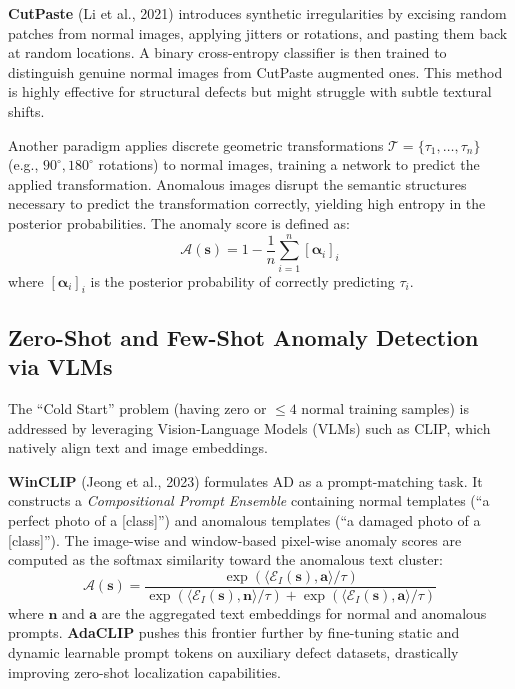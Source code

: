 \textbf{CutPaste} (Li et al., 2021) introduces synthetic irregularities by excising random patches from normal images, applying jitters or rotations, and pasting them back at random locations. A binary cross-entropy classifier is then trained to distinguish genuine normal images from CutPaste augmented ones. This method is highly effective for structural defects but might struggle with subtle textural shifts.

Another paradigm applies discrete geometric transformations $\mathcal{T} = \{\tau_1, \dots, \tau_n\}$ (e.g., $90^\circ, 180^\circ$ rotations) to normal images, training a network to predict the applied transformation. Anomalous images disrupt the semantic structures necessary to predict the transformation correctly, yielding high entropy in the posterior probabilities. The anomaly score is defined as:
\begin{equation}
    \mathcal{A}(\boldsymbol{s}) = 1 - \frac{1}{n} \sum_{i=1}^n [\boldsymbol{\alpha}_i]_i
\end{equation}
where $[\boldsymbol{\alpha}_i]_i$ is the posterior probability of correctly predicting $\tau_i$.

\subsection{Zero-Shot and Few-Shot Anomaly Detection via VLMs}
The ``Cold Start'' problem (having zero or $\le 4$ normal training samples) is addressed by leveraging Vision-Language Models (VLMs) such as CLIP, which natively align text and image embeddings.

\textbf{WinCLIP} (Jeong et al., 2023) formulates AD as a prompt-matching task. It constructs a \textit{Compositional Prompt Ensemble} containing normal templates (``a perfect photo of a [class]'') and anomalous templates (``a damaged photo of a [class]''). The image-wise and window-based pixel-wise anomaly scores are computed as the softmax similarity toward the anomalous text cluster:
\begin{equation}
    \mathcal{A}(\boldsymbol{s}) = \frac{\exp(\langle \mathcal{E}_I(\boldsymbol{s}), \boldsymbol{a} \rangle / \tau)}{\exp(\langle \mathcal{E}_I(\boldsymbol{s}), \boldsymbol{n} \rangle / \tau) + \exp(\langle \mathcal{E}_I(\boldsymbol{s}), \boldsymbol{a} \rangle / \tau)}
\end{equation}
where $\boldsymbol{n}$ and $\boldsymbol{a}$ are the aggregated text embeddings for normal and anomalous prompts. \textbf{AdaCLIP} pushes this frontier further by fine-tuning static and dynamic learnable prompt tokens on auxiliary defect datasets, drastically improving zero-shot localization capabilities.

